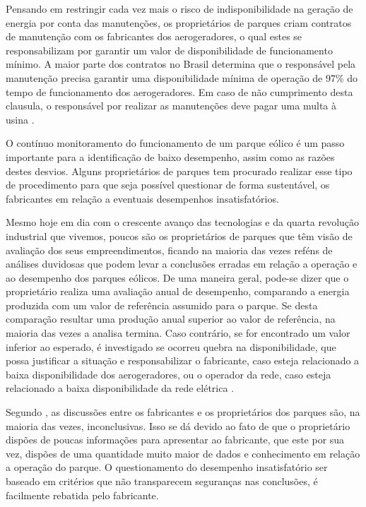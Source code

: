 Pensando em restringir cada vez mais o risco de indisponibilidade na geração de energia por conta das manutenções, os proprietários de parques criam contratos de manutenção com os fabricantes dos aerogeradores, o qual estes se responsabilizam por garantir um valor de disponibilidade de funcionamento mínimo. A maior parte dos contratos no Brasil determina que o responsável pela manutenção precisa garantir uma disponibilidade mínima de operação de 97\% do tempo de funcionamento dos aerogeradores. Em caso de não cumprimento desta clausula, o responsável por realizar as manutenções deve pagar uma multa à usina \cite{confiabilidade-aplicada-manutencao-preventiva}.

O contínuo monitoramento do funcionamento de um parque eólico é um passo importante para a identificação de baixo desempenho, assim como as razões destes desvios. Alguns proprietários de parques tem procurado realizar esse tipo de procedimento para que seja possível questionar de forma sustentável, os fabricantes em relação a eventuais desempenhos insatisfatórios.

Mesmo hoje em dia com o crescente avanço das tecnologias e da quarta revolução industrial que vivemos, poucos são os proprietários de parques que têm visão de avaliação dos seus empreendimentos, ficando na maioria das vezes reféns de análises duvidosas que podem levar a conclusões erradas em relação a operação e ao desempenho dos parques eólicos. De uma maneira geral, pode-se dizer que o proprietário realiza uma avaliação anual de desempenho, comparando a energia produzida com um valor de referência assumido para o parque. Se desta comparação resultar uma produção anual superior ao valor de referência, na maioria das vezes a analisa termina. Caso contrário, se for encontrado um valor inferior ao esperado, é investigado se ocorreu quebra na disponibilidade, que possa justificar a situação e responsabilizar o fabricante, caso esteja relacionado a baixa disponibilidade dos aerogeradores, ou o operador da rede, caso esteja relacionado a baixa disponibilidade da rede elétrica \cite{metodologia-avaliacao-desempenho-de-parques}.

Segundo , as discussões entre os fabricantes e os proprietários dos parques são, na maioria das vezes, inconclusivas. Isso se dá devido ao fato de que o proprietário dispões de poucas informações para apresentar ao fabricante, que este por sua vez, dispões de uma quantidade muito maior de dados e conhecimento em relação a operação do parque. O questionamento do desempenho insatisfatório ser baseado em critérios que não transparecem seguranças nas conclusões, é facilmente rebatida pelo fabricante.

